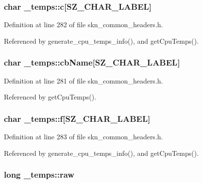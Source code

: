 \subsubsection[{\texorpdfstring{c}{c}}]{\setlength{\rightskip}{0pt plus 5cm}char \+\_\+temps\+::c\mbox{[}{\bf S\+Z\+\_\+\+C\+H\+A\+R\+\_\+\+L\+A\+B\+EL}\mbox{]}}\hypertarget{struct__temps_add683444c2985b00bd51bc69e9026a69}{}\label{struct__temps_add683444c2985b00bd51bc69e9026a69}


Definition at line 282 of file skn\+\_\+common\+\_\+headers.\+h.



Referenced by generate\+\_\+cpu\+\_\+temps\+\_\+info(), and get\+Cpu\+Temps().

\subsubsection[{\texorpdfstring{cb\+Name}{cbName}}]{\setlength{\rightskip}{0pt plus 5cm}char \+\_\+temps\+::cb\+Name\mbox{[}{\bf S\+Z\+\_\+\+C\+H\+A\+R\+\_\+\+L\+A\+B\+EL}\mbox{]}}\hypertarget{struct__temps_a74414216b43459f4ebcada36b9b165f5}{}\label{struct__temps_a74414216b43459f4ebcada36b9b165f5}


Definition at line 281 of file skn\+\_\+common\+\_\+headers.\+h.



Referenced by get\+Cpu\+Temps().

\subsubsection[{\texorpdfstring{f}{f}}]{\setlength{\rightskip}{0pt plus 5cm}char \+\_\+temps\+::f\mbox{[}{\bf S\+Z\+\_\+\+C\+H\+A\+R\+\_\+\+L\+A\+B\+EL}\mbox{]}}\hypertarget{struct__temps_a9de7d7f00c6df40b61735f25e3247b40}{}\label{struct__temps_a9de7d7f00c6df40b61735f25e3247b40}


Definition at line 283 of file skn\+\_\+common\+\_\+headers.\+h.



Referenced by generate\+\_\+cpu\+\_\+temps\+\_\+info(), and get\+Cpu\+Temps().

\subsubsection[{\texorpdfstring{raw}{raw}}]{\setlength{\rightskip}{0pt plus 5cm}long \+\_\+temps\+::raw}\hypertarget{struct__temps_a62d3522782b91f7fbb444bceb91c1876}{}\label{struct__temps_a62d3522782b91f7fbb444bceb91c1876}


